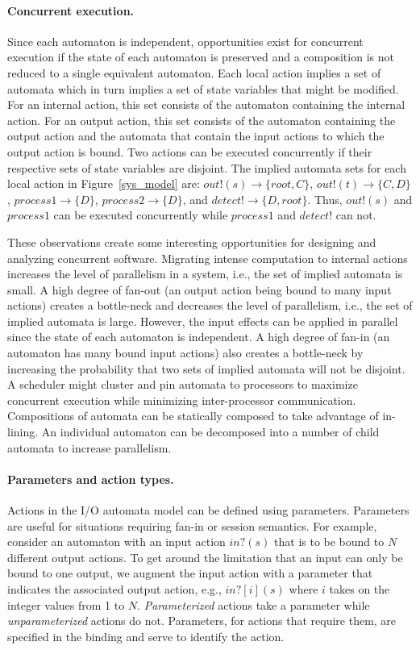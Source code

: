 \paragraph*{Concurrent execution.}
Since each automaton is independent, opportunities exist for concurrent execution if the state of each automaton is preserved and a composition is not reduced to a single equivalent automaton.
Each local action implies a set of automata which in turn implies a set of state variables that might be modified.
For an internal action, this set consists of the automaton containing the internal action.
For an output action, this set consists of the automaton containing the output action and the automata that contain the input actions to which the output action is bound.
Two actions can be executed concurrently if their respective sets of state variables are disjoint.
The implied automata sets for each local action in Figure~\ref{sys_model} are: $out!(s) \to \{root, C\}$, $out!(t) \to \{C, D\}$, $process1 \to \{D\}$, $process2 \to \{D\}$, and $detect! \to \{D, root\}$.
Thus, $out!(s)$ and $process1$ can be executed concurrently while $process1$ and $detect!$ can not.

\ifjournal
These observations create some interesting opportunities for designing and analyzing concurrent software.
Migrating intense computation to internal actions increases the level of parallelism in a system, i.e., the set of implied automata is small.
A high degree of fan-out (an output action being bound to many input actions) creates a bottle-neck and decreases the level of parallelism, i.e., the set of implied automata is large.
However, the input effects can be applied in parallel since the state of each automaton is independent.
A high degree of fan-in (an automaton has many bound input actions) also creates a bottle-neck by increasing the probability that two sets of implied automata will not be disjoint.
A scheduler might cluster and pin automata to processors to maximize concurrent execution while minimizing inter-processor communication.
Compositions of automata can be statically composed to take advantage of in-lining.
An individual automaton can be decomposed into a number of child automata to increase parallelism.

\paragraph*{Parameters and action types.}
Actions in the I/O automata model can be defined using parameters.
Parameters are useful for situations requiring fan-in or session semantics.
For example, consider an automaton with an input action $in?(s)$ that is to be bound to $N$ different output actions.
To get around the limitation that an input can only be bound to one output, we augment the input action with a parameter that indicates the associated output action, e.g., $in?[i](s)$ where $i$ takes on the integer values from 1 to $N$.
\emph{Parameterized} actions take a parameter while \emph{unparameterized} actions do not.
Parameters, for actions that require them, are specified in the binding and serve to identify the action.

